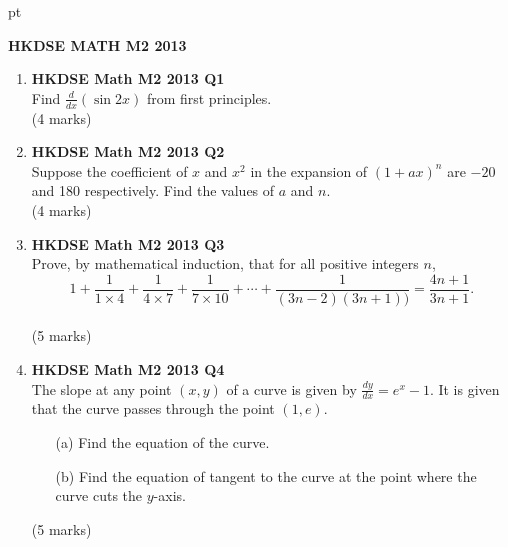 \documentclass[12pt]{article}
\begin{document}
 pt
\begin{center}
	{\large \bf HKDSE MATH M2 2013}\\
	\vspace{2 mm}

\end{center}
\vspace{0.05cm}

\begin{enumerate}
	\item \textbf{HKDSE Math M2 2013 Q1}\\
	Find $\displaystyle\frac{d}{dx} (\sin{2x})$ from first principles. \\(4 marks)


	\item \textbf{HKDSE Math M2 2013 Q2}\\
	Suppose the coefficient of $x$ and $x^2$ in the expansion of $(1+ax)^n$ are $-20$ and 180 respectively. Find the values of $a$ and $n$. \\(4 marks)


	\item \textbf{HKDSE Math M2 2013 Q3}\\
	Prove, by mathematical induction, that for all positive integers $n$, $$\displaystyle 1 + \frac{1}{1 \times 4} + \frac{1}{4 \times 7} + \frac{1}{7 \times 10} + \cdots + \frac{1}{(3n-2)(3n+1))} = \frac{4n+1}{3n+1}.$$ \\(5 marks)
		

	\item \textbf{HKDSE Math M2 2013 Q4}\\
	The slope at any point $(x,y)$ of a curve is given by $\displaystyle\frac{dy}{dx} = e^x - 1$. It is given that the curve passes through the point $(1,e)$. 
	\begin{enumerate}
		\item [(a)]Find the equation of the curve.
		\item [(b)]Find the equation of tangent to the curve at the point where the curve cuts the $y$-axis.
	\end{enumerate}
	(5 marks)


\end{enumerate}
\end{document}
